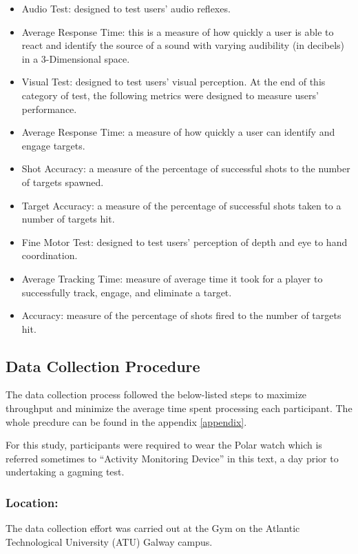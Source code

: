 \begin{itemize}
    \item Audio Test: designed to test users’ audio reflexes. 
    \item Average Response Time: this is a measure of how quickly a user is able to react and identify the source of a sound with varying audibility (in decibels) in a 3-Dimensional space. 
    \item Visual Test: designed to test users’ visual perception. At the end of this category of test, the following metrics were designed to measure users’ performance. 
    \item Average Response Time: a measure of how quickly a user can identify and engage targets. 
    \item Shot Accuracy: a measure of the percentage of successful shots to the number of targets spawned. 
    \item Target Accuracy: a measure of the percentage of successful shots taken to a number of targets hit. 
    \item Fine Motor Test: designed to test users’ perception of depth and eye to hand coordination. 
    \item Average Tracking Time: measure of average time it took for a player to successfully track, engage, and eliminate a target.
    \item Accuracy: measure of the percentage of shots fired to the number of targets hit. 
\end{itemize}

\subsection{Data Collection Procedure}

The data collection process followed the below-listed steps to maximize throughput and minimize the average time spent processing each participant. The whole precdure can be found in the appendix \ref{appendix}.
\par
For this study, participants were required to wear the Polar watch which is referred sometimes to “Activity Monitoring Device” in this text, a day prior to undertaking a gagming test. 

\subsubsection*{Location:}

The data collection effort was carried out at the Gym on the Atlantic Technological University (ATU) Galway campus.

